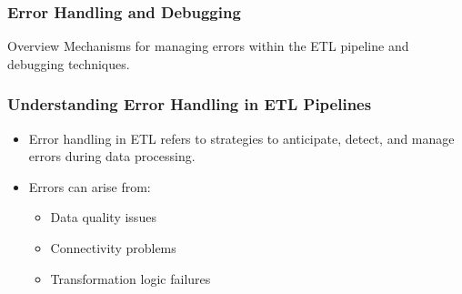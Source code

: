 \documentclass[aspectratio=169]{beamer}
\begin{document}
\begin{frame}[fragile]
    \frametitle{Error Handling and Debugging}
    \begin{block}{Overview}
        Mechanisms for managing errors within the ETL pipeline and debugging techniques.
    \end{block}
\end{frame}

\begin{frame}[fragile]
    \frametitle{Understanding Error Handling in ETL Pipelines}
    \begin{itemize}
        \item Error handling in ETL refers to strategies to anticipate, detect, and manage errors during data processing.
        \item Errors can arise from:
        \begin{itemize}
            \item Data quality issues
            \item Connectivity problems
            \item Transformation logic failures
        \end{itemize}
    \end{itemize}
\end{frame}
\end{document}
